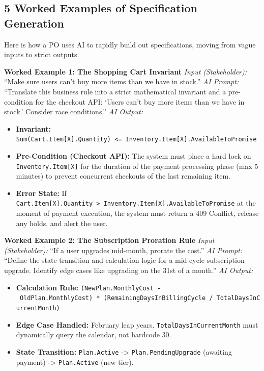 \documentclass[
  11pt,
  openany,
  oneside]{book}
\providecommand{\tightlist}{%
  \setlength{\itemsep}{0pt}\setlength{\parskip}{0pt}}
\begin{document}
\subsection{5 Worked Examples of Specification
Generation}\label{worked-examples-of-specification-generation}

Here is how a PO uses AI to rapidly build out specifications, moving
from vague inputs to strict outputs.

\textbf{Worked Example 1: The Shopping Cart Invariant} \emph{Input
(Stakeholder):} ``Make sure users can't buy more items than we have in
stock.'' \emph{AI Prompt:} ``Translate this business rule into a strict
mathematical invariant and a pre-condition for the checkout API: `Users
can't buy more items than we have in stock.' Consider race conditions.''
\emph{AI Output:}

\begin{itemize}
\tightlist
\item
  \textbf{Invariant:}
  \texttt{Sum(Cart.Item{[}X{]}.Quantity)\ \textless{}=\ Inventory.Item{[}X{]}.AvailableToPromise}
\item
  \textbf{Pre-Condition (Checkout API):} The system must place a hard
  lock on \texttt{Inventory.Item{[}X{]}} for the duration of the payment
  processing phase (max 5 minutes) to prevent concurrent checkouts of
  the last remaining item.
\item
  \textbf{Error State:} If
  \texttt{Cart.Item{[}X{]}.Quantity\ \textgreater{}\ Inventory.Item{[}X{]}.AvailableToPromise}
  at the moment of payment execution, the system must return a 409
  Conflict, release any holds, and alert the user.
\end{itemize}

\textbf{Worked Example 2: The Subscription Proration Rule} \emph{Input
(Stakeholder):} ``If a user upgrades mid-month, prorate the cost.''
\emph{AI Prompt:} ``Define the state transition and calculation logic
for a mid-cycle subscription upgrade. Identify edge cases like upgrading
on the 31st of a month.'' \emph{AI Output:}

\begin{itemize}
\tightlist
\item
  \textbf{Calculation Rule:}
  \texttt{(NewPlan.MonthlyCost\ -\ OldPlan.MonthlyCost)\ *\ (RemainingDaysInBillingCycle\ /\ TotalDaysInCurrentMonth)}
\item
  \textbf{Edge Case Handled:} February leap years.
  \texttt{TotalDaysInCurrentMonth} must dynamically query the calendar,
  not hardcode 30.
\item
  \textbf{State Transition:} \texttt{Plan.Active} -\textgreater{}
  \texttt{Plan.PendingUpgrade} (awaiting payment) -\textgreater{}
  \texttt{Plan.Active} (new tier).
\end{itemize}
\end{document}
